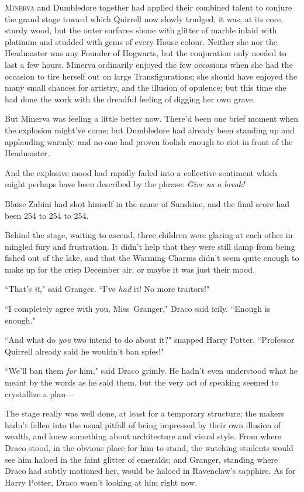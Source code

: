 
\lettrine{M}{inerva} and Dumbledore together had applied their combined talent to conjure the grand stage toward which Quirrell now slowly trudged; it was, at its core, sturdy wood, but the outer surfaces shone with glitter of marble inlaid with platinum and studded with gems of every House colour. Neither she nor the Headmaster was any Founder of Hogwarts, but the conjuration only needed to last a few hours. Minerva ordinarily enjoyed the few occasions when she had the occasion to tire herself out on large Transfigurations; she should have enjoyed the many small chances for artistry, and the illusion of opulence; but this time she had done the work with the dreadful feeling of digging her own grave.

But Minerva was feeling a little better now. There'd been one brief moment when the explosion might've come; but Dumbledore had already been standing up and applauding warmly, and no-one had proven foolish enough to riot in front of the Headmaster.

And the explosive mood had rapidly faded into a collective sentiment which might perhaps have been described by the phrase: \emph{Give us a break!}

Blaise Zabini had shot himself in the name of Sunshine, and the final score had been 254 to 254 to 254.

\later

Behind the stage, waiting to ascend, three children were glaring at each other in mingled fury and frustration. It didn't help that they were still damp from being fished out of the lake, and that the Warming Charms didn't seem quite enough to make up for the crisp December air, or maybe it was just their mood.

``That's \emph{it}," said Granger. ``I've \emph{had} it! No more traitors!"

``I completely agree with you, Miss~Granger," Draco said icily. ``Enough is enough."

``And what do \emph{you} two intend to do about it?" snapped Harry Potter. ``Professor Quirrell already said he wouldn't ban spies!"

``We'll ban them \emph{for} him," said Draco grimly. He hadn't even understood what he meant by the words as he said them, but the very act of speaking seemed to crystallize a plan—

\later

The stage really was well done, at least for a temporary structure; the makers hadn't fallen into the usual pitfall of being impressed by their own illusion of wealth, and knew something about architecture and visual style. From where Draco stood, in the obvious place for him to stand, the watching students would see him haloed in the faint glitter of emeralds; and Granger, standing where Draco had subtly motioned her, would be haloed in Ravenclaw's sapphire. As for Harry Potter, Draco wasn't looking at him right now.

